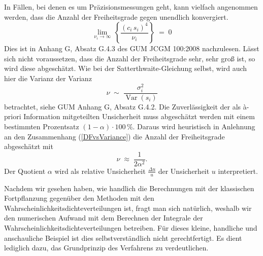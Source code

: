 In Fällen, bei denen es um Präzisionsmessungen geht, kann vielfach angenommen werden,
dass die Anzahl der Freiheitsgrade gegen unendlich konvergiert.
\begin{equation}
\lim\limits_{\nu_i \rightarrow \infty} \, \left\{ \frac{ (c_i \, s_i)^4}{\nu_i} \right\} \; = \; 0
\end{equation}
Dies ist in Anhang G, Absatz G.4.3 des GUM JCGM 100:2008 nachzulesen. Lässt sich nicht
voraussetzen, dass die Anzahl der Freiheitsgrade sehr, sehr groß ist, so wird diese
abgeschätzt. Wie bei der Satterthwaite-Gleichung selbst, wird auch hier die Varianz der Varianz
\begin{equation}
\nu \; \sim \; \frac{\sigma_i^2}{\operatorname{Var}(s_i)}
\label{DFvsVariance}
\end{equation}
betrachtet, siehe GUM Anhang G, Absatz G.4.2.
Die Zuverlässigkeit der als {\`a}-priori Information mitgeteilten Unsicherheit muss
abgeschätzt werden mit einem bestimmten Prozentsatz
$(1 - \alpha) \cdot 100 \, \%$. Daraus wird heuristisch in Anlehnung an den
Zusammenhang (\ref{DFvsVariance}) die Anzahl der Freiheitsgrade abgeschätzt mit
\begin{equation}
\nu \; \approx \; \frac{1}{2 \alpha^2} .
\end{equation}
Der Quotient $\alpha$ wird als relative Unsicherheit $\frac{\Delta u}{u}$ der Unsicherheit $u$
interpretiert.

Nachdem wir gesehen haben, wie handlich die Berechnungen mit der klassischen Fortpflanzung
gegenüber den Methoden mit den Wahrscheinlichkeitsdichteverteilungen ist,
fragt man sich natürlich, weshalb wir den numerischen Aufwand mit dem Berechnen der
Integrale der Wahrscheinlichkeitsdichteverteilungen betreiben.
Für dieses kleine, handliche und anschauliche Beispiel ist dies selbstverständlich nicht
gerechtfertigt. Es dient lediglich dazu, das Grundprinzip des Verfahrens zu verdeutlichen.


